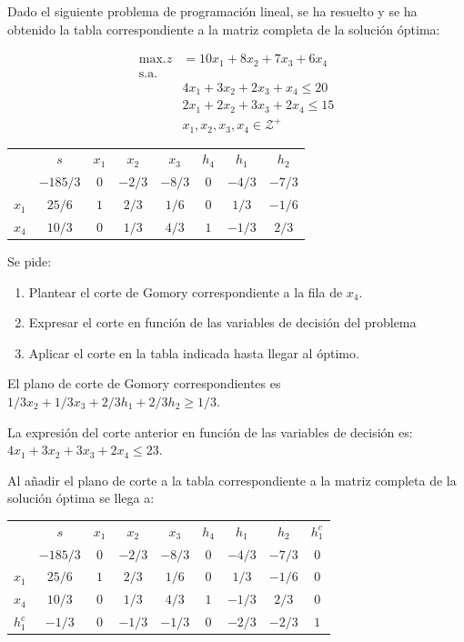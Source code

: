 
Dado el siguiente problema de programación lineal, se ha resuelto y se ha obtenido la tabla correspondiente a la matriz completa de la solución óptima:

\begin{align*}
    \text{max.} z &= 10x_1 + 8x_2 + 7x_3 + 6x_4 \\
    \text{s.a. }& \\
    &4x_1 + 3x_2 + 2x_3 + x_4 \le 20 \\
    &2x_1 + 2x_2 + 3x_3 + 2x_4 \le 15 \\
    &x_1, x_2, x_3, x_4 \in  \mathcal{Z^+}
\end{align*}

 \begin{center}
    \begin{tabular}{c|c|cccccc|}
     & $s$ & $x_1$ & $x_2$ & $x_3$ & $h_4$ &$h_1$ & $h_2$ \\
     & $-185/3$ & $0$ & $-2/3$ & $-8/3$ & $0$ &$-4/3$ & $-7/3$  \\
    \hline
    $x_1$ & $25/6$  & $1$ & $2/3$ & $1/6$ & $0$ & $1/3$ & $-1/6$\\
    $x_4$ & $10/3$  & $0$ & $1/3$ & $4/3$ & $1$ &  $-1/3$ &$2/3$ \\
    \hline
    \end{tabular}
\end{center}

Se pide:
\begin{enumerate}
    \item Plantear el corte de Gomory correspondiente a la fila de $x_4$.
    \item Expresar el corte en función de las variables de decisión del problema
    \item Aplicar el corte en la tabla indicada hasta llegar al óptimo.
\end{enumerate}

El plano de corte de Gomory correspondientes es $1/3x_2+1/3x_3+2/3h_1+2/3h_2\geq1/3$.

La expresión del corte anterior en función de las variables de decisión es: $4x_1+3x_2+3x_3+2x_4\leq 23$.

Al añadir el plano de corte a la tabla correspondiente a la matriz completa de la solución óptima se llega a:
 \begin{center}
    \begin{tabular}{c|c|ccccccc|}
     & $s$ & $x_1$ & $x_2$ & $x_3$ & $h_4$ &$h_1$ & $h_2$ & $h^c_1$ \\
     & $-185/3$ & $0$ & $-2/3$ & $-8/3$ & $0$ &$-4/3$ & $-7/3$ &0 \\
    \hline
    $x_1$ & $25/6$  & $1$ & $2/3$ & $1/6$ & $0$ & $1/3$ & $-1/6$&0\\
    $x_4$ & $10/3$  & $0$ & $1/3$ & $4/3$ & $1$ &  $-1/3$ &$2/3$ &0\\
    $h_1^c$ & $-1/3$  & $0$ & $-1/3$ & $-1/3$ & $0$ &  $-2/3$ &$-2/3$ & $1$\\
    \hline
    \end{tabular}
\end{center}

